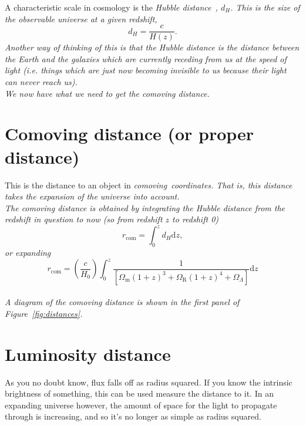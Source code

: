 \documentclass[]{article}
\begin{document}
\noindent A characteristic scale in cosmology is the \itshape Hubble distance~\upshape, $d_H$. This is the size of the observable universe at a given redshift,
\begin{equation}
d_H = \frac{c}{H(z)}.
\end{equation}
Another way of thinking of this is that the Hubble distance is the distance between the Earth and the galaxies which are currently receding from us at the speed of light (i.e. things which are just now becoming invisible to us because their light can never reach us). \\

\noindent We now have what we need to get the comoving distance.

\section{Comoving distance (or proper distance)}

This is the distance to an object in \itshape comoving~\upshape coordinates. That is, this distance takes the expansion of the universe into account. \\

\noindent The comoving distance is obtained by integrating the Hubble distance from the redshift in question to now (so from redshift $z$ to redshift 0)
\begin{equation}
r_\mathrm{com} = \int_0^z d_H \mathrm{d}z,
\end{equation}
or expanding
\begin{equation}
\boxed{r_\mathrm{com} = \left(\frac{c}{H_0}\right)\int_0^z \frac{1}{[\Omega_\mathrm{m} (1+z)^{3}+\Omega_\mathrm{R} (1+z)^{4}+\Omega_\Lambda]}\mathrm{d}z}
\end{equation}\\

\noindent A diagram of the comoving distance is shown in the first panel of Figure~\ref{fig:distances}.

\section{Luminosity distance}

As you no doubt know, flux falls off as radius squared. If you know the intrinsic brightness of something, this can be used measure the distance to it. In an expanding universe however, the amount of space for the light to propagate through is increasing, and so it’s no longer as simple as radius squared. \\
\end{document}
